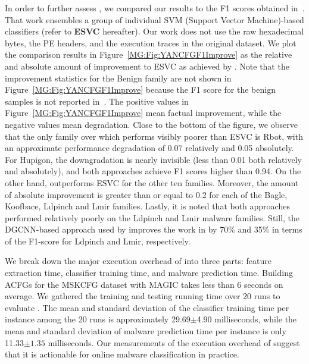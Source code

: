 In order to further assess \sysname, we compared our results to the F1 scores obtained in~\cite{YanDataset}.
That work ensembles a group of individual SVM (Support Vector Machine)-based classifiers (refer to \textbf{ESVC} hereafter). Our work does not use the raw hexadecimal bytes, the PE headers, and the execution traces in the original dataset.%
We plot the comparison results in Figure~\ref{MG:Fig:YANCFGF1Improve} as the relative and absolute amount of improvement to ESVC as achieved by \sysname.
Note that the improvement statistics for the Benign family are not shown in Figure~\ref{MG:Fig:YANCFGF1Improve} because the F1 score for the benign samples is not reported in~\cite{YanDataset}.
The positive values in Figure~\ref{MG:Fig:YANCFGF1Improve} mean factual improvement, while the negative values mean degradation.
Close to the bottom of the figure, we observe that the only family over which \sysname performs visibly poorer than ESVC is Rbot, with an approximate performance degradation of 0.07 relatively and 0.05 absolutely.
For Hupigon, the downgradation is nearly invisible (less than 0.01 both relatively and absolutely), and both approaches achieve F1 scores higher than 0.94.
On the other hand, \sysname outperforms ESVC for the other ten families.
Moreover, the amount of absolute improvement is greater than or equal to 0.2 for each of the Bagle, Koofbace, Ldpinch and Lmir families.
Lastly, it is noted that both approaches performed relatively poorly on the Ldpinch and Lmir malware families. Still, the DGCNN-based approach used by \sysname improves the work in \cite{YanDataset} by 70\% and 35\% in terms of the F1-score for Ldpinch and Lmir, respectively.


We break down the major execution overhead of \sysname into three parts: feature extraction time, classifier training time, and malware prediction time.
Building ACFGs for the MSKCFG dataset with MAGIC takes less than 6 seconds on average.
We gathered the training and testing running time over 20 runs to evaluate \sysname.
The mean and standard deviation of the classifier training time per instance among the 20 runs is approximately 29.69$\pm$4.90 milliseconds,
while the mean and standard deviation of malware prediction time per instance is only 11.33$\pm1.35$ milliseconds.
Our measurements of the execution overhead of \sysname suggest that it is actionable for online malware classification in practice.

